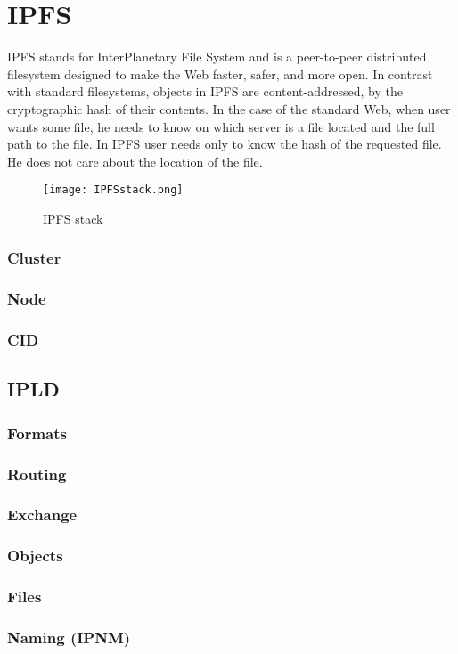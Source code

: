 \chapter{IPFS}

IPFS stands for InterPlanetary File System and is a peer-to-peer distributed filesystem designed to make the Web faster, safer, and more open. In contrast with standard filesystems, objects in IPFS are content-addressed, by the cryptographic hash of their contents. In the case of the standard Web, when user wants some file, he needs to know on which server is a file located and the full path to the file. In IPFS user needs only to know the hash of the requested file. He does not care about the location of the file.

\begin{figure}[H]
    \centering
    \texttt{[image: IPFSstack.png]}
    \caption{IPFS stack}
    \label{}
\end{figure}


\subsection{Cluster}
\subsection{Node}
\subsection{CID}



\section{IPLD}
\subsection{Formats} 
\subsection{Routing} 
\subsection{Exchange} 
\subsection{Objects}  
\subsection{Files}  
\subsection{Naming (IPNM)}



